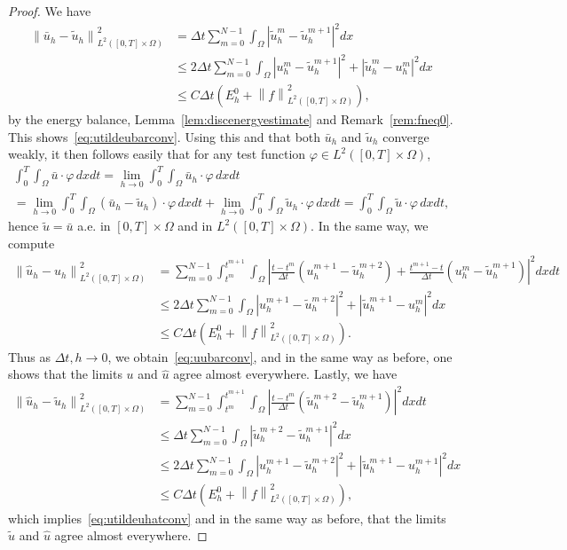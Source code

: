 \documentclass[10pt,letterpaper]{amsart}
\newcommand{\tu}{\widetilde{u}}
\newcommand{\hu}{\widehat{u}}
\newcommand\norm[1]{\left\lVert#1\right\rVert}
\newcommand{\dom}{\Omega}
\theoremstyle{definition}{\newtheorem{definition}[lemma]{Definition}}
\numberwithin{equation}{section}
\begin{document}
\begin{proof}
		We have
	\begin{align*}
		\norm{\bar{u}_h-\tu_h}_{L^2([0,T]\times\dom)}^2 & = \Delta t\sum_{m=0}^{N-1}\int_{\dom}\left|\tu^m_h-\tu^{m+1}_h\right|^2 dx \\
		& \leq 2 \Delta t\sum_{m=0}^{N-1}\int_{\dom}\left|u^m_h-\tu^{m+1}_h\right|^2 + \left|\tu_h^m-u_h^m\right|^2 dx \\
		&\leq C\Delta t (E_h^0+\norm{f}_{L^2([0,T]\times\dom)}^2),
	\end{align*}
	by the energy balance, Lemma~\ref{lem:discenergyestimate} and Remark~\ref{rem:fneq0}. This shows~\eqref{eq:utildeubarconv}. 
	Using this and that both $\bar{u}_h$ and $\tu_h$ converge weakly, it then follows easily that for any test function $\varphi\in L^2([0,T]\times\dom) $,
	\begin{multline*}
		\int_0^T\!\!\int_{\dom}\bar{u}\cdot \varphi\, dx dt = \lim_{h\to 0} \int_0^T\!\!\int_{\dom}\bar{u}_h\cdot \varphi\, dx dt\\
		= \lim_{h\to 0}\int_0^T\!\!\int_{\dom}(\bar{u}_h-\tu_h)\cdot \varphi\, dx dt+ \lim_{h\to 0}\int_0^T\!\!\int_{\dom}\tu_h\cdot \varphi \,dx dt =\int_0^T\!\!\int_{\dom}\tu\cdot \varphi\, dx dt,
	\end{multline*}
	hence $\tu=\bar{u}$ a.e. in $[0,T]\times\dom$ and in $L^2([0,T]\times\dom)$.
In the same way, we compute
	\begin{align*}
		\norm{\hu_h-u_h}_{L^2([0,T]\times\dom)}^2 & = \sum_{m=0}^{N-1}\int_{t^m}^{t^{m+1}}\!\!\int_{\dom}\left|\frac{t-t^m}{\Delta t}(u^{m+1}_h-\tu^{m+2}_h)+ \frac{t^{m+1}-t}{\Delta t}(u^m_h - \tu^{m+1}_h)\right|^2 dx dt\\
		&\leq 2\Delta t\sum_{m=0}^{N-1}\int_{\dom}\left|u^{m+1}_h-\tu^{m+2}_h\right|^2+\left|\tu^{m+1}_h-u^m_h\right|^2 dx \\
		&\leq C\Delta t (E_h^0+\norm{f}_{L^2([0,T]\times\dom)}^2).
	\end{align*}
	Thus as $\Delta t,h \to 0$, we obtain~\eqref{eq:uubarconv}, and in the same way as before, one shows that the limits $u$ and $\hu$ agree almost everywhere. Lastly, we have
	 	\begin{align*}
	 	\norm{\hu_h-\tu_h}_{L^2([0,T]\times\dom)}^2 & = \sum_{m=0}^{N-1}\int_{t^m}^{t^{m+1}}\!\!\int_{\dom}\left|\frac{t-t^m}{\Delta t}(\tu^{m+2}_h-\tu^{m+1}_h)\right|^2 dx dt\\
	 	&\leq \Delta t\sum_{m=0}^{N-1}\int_{\dom}\left|\tu^{m+2}_h-\tu^{m+1}_h\right|^2 dx \\
	 	&\leq 2\Delta t\sum_{m=0}^{N-1}\int_{\dom}\left|u^{m+1}_h-\tu^{m+2}_h\right|^2+\left|\tu^{m+1}_h-u^{m+1}_h\right|^2 dx \\
	 	&\leq C\Delta t (E_h^0+\norm{f}_{L^2([0,T]\times\dom)}^2),
	 \end{align*}
	 which implies~\eqref{eq:utildeuhatconv} and in the same way as before, that the limits $\tu$ and $\hu$ agree almost everywhere.
\end{proof}
\end{document}
